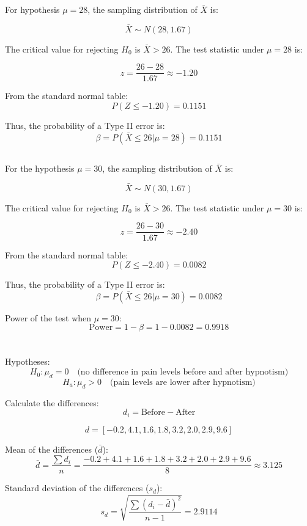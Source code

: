 \documentclass{homework}
\begin{document}
For hypothesis \( \mu = 28 \), the sampling distribution of \( \bar{X} \) is:

\[
\bar{X} \sim N(28, 1.67)
\]

The critical value for rejecting \( H_0 \) is \( \bar{X} > 26 \). The test statistic under \( \mu = 28 \) is:

\[
z = \frac{26 - 28}{1.67} \approx -1.20
\]

From the standard normal table:
\[
P(Z \leq -1.20) = 0.1151
\]

Thus, the probability of a Type II error is:
\[
\beta = P(\bar{X} \leq 26 | \mu = 28) = 0.1151
\]

\subsection{}

For the hypothesis \( \mu = 30 \), the sampling distribution of \( \bar{X} \) is:

\[
\bar{X} \sim N(30, 1.67)
\]

The critical value for rejecting \( H_0 \) is \( \bar{X} > 26 \). The test statistic under \( \mu = 30 \) is:

\[
z = \frac{26 - 30}{1.67} \approx -2.40
\]

From the standard normal table:
\[
P(Z \leq -2.40) = 0.0082
\]

Thus, the probability of a Type II error is:
\[
\beta = P(\bar{X} \leq 26 | \mu = 30) = 0.0082
\]

Power of the test when \( \mu = 30 \):
\[
\text{Power} = 1 - \beta = 1 - 0.0082 = 0.9918
\]

\section{}

Hypotheses:
\[
H_0: \mu_d = 0 \quad \text{(no difference in pain levels before and after hypnotism)}
\]
\[
H_a: \mu_d > 0 \quad \text{(pain levels are lower after hypnotism)}
\]


Calculate the differences:
\[
d_i = \text{Before} - \text{After}
\]

\[
d = [-0.2, 4.1, 1.6, 1.8, 3.2, 2.0, 2.9, 9.6]
\]

Mean of the differences (\( \bar{d} \)):
\[
\bar{d} = \frac{\sum d_i}{n} = \frac{-0.2 + 4.1 + 1.6 + 1.8 + 3.2 + 2.0 + 2.9 + 9.6}{8} \approx 3.125
\]

Standard deviation of the differences (\( s_d \)):
\[
s_d = \sqrt{\frac{\sum (d_i - \bar{d})^2}{n-1}} = 2.9114
\]
\end{document}

